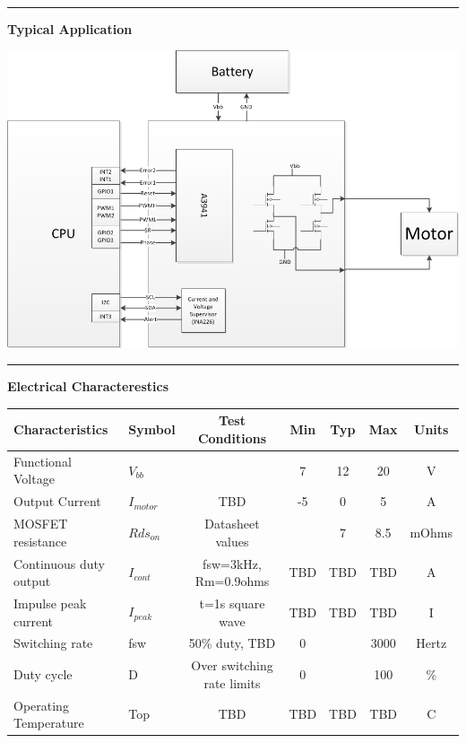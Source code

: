 \documentclass{article}
\begin{document}
\\
\hspace{0.3in}
\hrule
\hspace{0.3in}
\begin{center} 
\large{\textbf{Typical Application}}
\end{center}
\begin{center}
\includegraphics[width=6in]{CB01_block.png}
\end{center}
\hrule
\newpage
\large{\textbf{Electrical Characterestics}} \\
\begin{center}
\begin{tabular}{|l | l |c| c|c|c|c|}
\hline
Characteristics & Symbol &Test Conditions & Min & Typ & Max & Units \\ \hline
Functional Voltage& $V_{bb}$& & 7&12&20&V \\ \hline 
Output Current & $I_{motor}$ & TBD& -5 & 0& 5 &A \\ \hline
MOSFET resistance & $Rds_{on}$  & Datasheet values& & 7 & 8.5 & mOhms\\\hline
Continuous duty output &$I_{cont}$ & fsw=3kHz, Rm=0.9ohms& TBD&TBD&TBD& A\\ \hline
Impulse peak current& $I_{peak}$& t=1s square wave& TBD& TBD& TBD&I \\ \hline
Switching rate &fsw & 50\% duty, TBD &0&&3000& Hertz\\  \hline
Duty cycle &D& Over switching rate limits& 0&&100&\% \\ \hline
Operating Temperature& Top& TBD& TBD& TBD&TBD&C \\\hline

\hline
\end{tabular}
\end{center}
\end{document}
